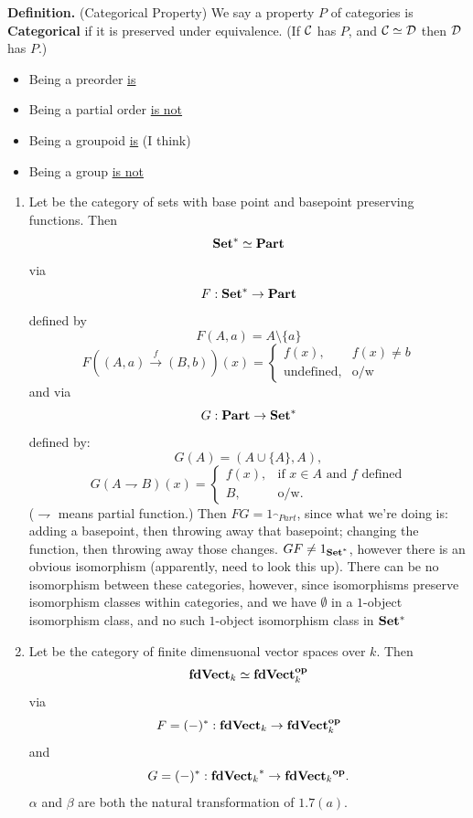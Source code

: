 \documentclass{article}
\begin{document}
\textbf{Definition. }(Categorical Property) We say a property $P$ of categories is \textbf{Categorical} if it is preserved under equivalence. (If $\mathcal{C}$ has $P$, and $\mathcal{C} \simeq \mathcal{D}$ then $\mathcal{D}$ has $P$.)
\begin{itemize}
    \item Being a preorder \underline{is}
    \item Being a partial order \underline{is not}
    \item Being a groupoid \underline{is} (I think)
    \item Being a group \underline{is not}
\end{itemize}
\exs \hspace{0.1cm} \begin{enumerate}
    \item[(a)] Let  be the category of sets with base point and basepoint preserving functions. Then \[\textbf{Set$^{*}$} \simeq \textbf{Part}\] via \[ F: \textbf{Set$^{*}$} \to \textbf{Part}\] defined by \[ F(A,a)= A \setminus \{a\}\] \[ F((A,a) \xrightarrow f (B,b))(x) = \begin{cases}
        f(x), & f(x) \neq b\\
        \text{undefined}, & \text{o/w}
    \end{cases}\]
    and via \[ G : \textbf{Part} \to \textbf{Set$^{*}$} \] defined by:
    \[ G(A) = (A \cup \{ A \}, A),\] \[ G(A \rightharpoondown B)(x) = \begin{cases}
        f(x), & \text{if $x \in A$ and $f$ defined}\\
        B, & \text{o/w}.
    \end{cases}
    \] ($\rightharpoondown$ means partial function.) Then $FG = 1_{\cat{Part}}$, since what we're doing is: adding a basepoint, then throwing away that basepoint; changing the function, then throwing away those changes. $GF \neq 1_{\textbf{Set$^{*}$}}$, however there is an obvious isomorphism (apparently, need to look this up). 
    There can be no isomorphism between these categories, however, since isomorphisms preserve isomorphism classes within categories, and we have $\emptyset$ in  a $1$-object isomorphism class, and no such $1$-object isomorphism class in $\textbf{Set$^{*}$}$
    \item[(b)] Let  be the category of finite dimensuonal vector spaces over $k$. \gap Then \[\textbf{fdVect$_{k}$} \simeq \textbf{fdVect$_{k}^{\text{op}}$} \] via \[ F = (-)^{*} : \textbf{fdVect$_{k}$} \to \textbf{fdVect$_{k}^{\text{op}}$}\] and \[ G = (-)^{*} : \textbf{fdVect$_{k}$}^{*} \to \textbf{fdVect$_{k}$$^{\text{op}}$}. \] $\alpha$ and $\beta$ are both the natural transformation of $1.7(a)$.

\end{enumerate}
\end{document}
